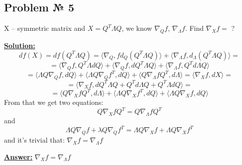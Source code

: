 \subsection{Problem № 5} 
X -- symmetric matrix and $X = Q^T \Lambda Q$, we know $\nabla_{Q} f$, $\nabla_{\Lambda}f$. Find $\nabla_X f = $ ?

\underline{\textbf{Solution:}} 
\begin{equation*}
    df(X) = d f(Q^T\Lambda Q) = \langle \nabla_{Q}, f d_Q (Q^T\Lambda Q) \rangle + \langle \nabla_{\Lambda}f, d_{\Lambda}(Q^T\Lambda Q) \rangle = 
\end{equation*}
\begin{equation*}
    = \langle \nabla_Q f,  Q^T\Lambda dQ \rangle + \langle \nabla_Q f, dQ^T\Lambda Q \rangle + \langle \nabla_{\Lambda}f,Q^T d\Lambda Q \rangle 
\end{equation*}
\begin{equation*}
    = \langle \Lambda Q \nabla_Q f, dQ \rangle + \langle \Lambda Q \nabla_Q f^T, dQ \rangle + \langle Q \nabla_{\Lambda} f Q^T, d \Lambda \rangle = \langle \nabla_X f, dX \rangle =
\end{equation*}
\begin{equation*}
    = \langle \nabla_X f, dQ^T \Lambda Q + Q^T d\Lambda Q + Q^T \Lambda dQ \rangle =
\end{equation*}
\begin{equation*}
 = \langle Q \nabla_X f Q^T, d \Lambda \rangle + \langle \Lambda Q \nabla_X f^T, dQ \rangle  + \langle \Lambda Q \nabla_X f, dQ \rangle
\end{equation*}
From that we get two equations:
$$
Q \nabla_X f Q^T = Q \nabla_{\Lambda} f Q^T
$$
and
$$
\Lambda Q \nabla_Q f + \lambda Q \nabla_Q f^T = \Lambda Q \nabla_X f + \Lambda Q \nabla_X f^T
$$
and it's trivial that: $\nabla_X f = \nabla_{\Lambda} f$

\underline{\textbf{Answer:}} $\nabla_X f = \nabla_{\Lambda} f$
